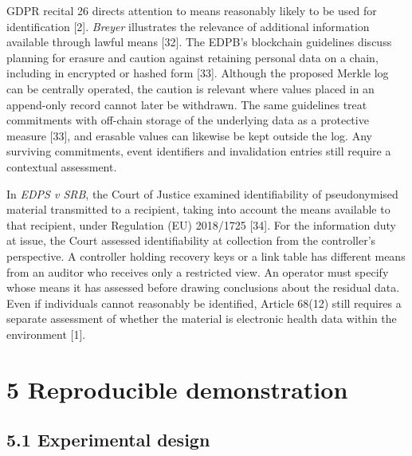 \documentclass[preprint,review,12pt]{elsarticle}
\begin{document}
GDPR recital 26 directs attention to means reasonably likely to be used
for identification {[}2{]}. \emph{Breyer} illustrates the relevance of
additional information available through lawful means {[}32{]}. The
EDPB's blockchain guidelines discuss planning for erasure and caution
against retaining personal data on a chain, including in encrypted or
hashed form {[}33{]}. Although the proposed Merkle log can be centrally
operated, the caution is relevant where values placed in an append-only
record cannot later be withdrawn. The same guidelines treat commitments
with off-chain storage of the underlying data as a protective measure
{[}33{]}, and erasable values can likewise be kept outside the log. Any
surviving commitments, event identifiers and invalidation entries still
require a contextual assessment.

In \emph{EDPS v SRB}, the Court of Justice examined identifiability of
pseudonymised material transmitted to a recipient, taking into account
the means available to that recipient, under Regulation (EU) 2018/1725
{[}34{]}. For the information duty at issue, the Court assessed
identifiability at collection from the controller's perspective. A
controller holding recovery keys or a link table has different means
from an auditor who receives only a restricted view. An operator must
specify whose means it has assessed before drawing conclusions about the
residual data. Even if individuals cannot reasonably be identified,
Article 68(12) still requires a separate assessment of whether the
material is electronic health data within the environment {[}1{]}.

\hypertarget{reproducible-demonstration}{%
\section{5 Reproducible
demonstration}\label{reproducible-demonstration}}

\hypertarget{experimental-design}{%
\subsection{5.1 Experimental design}\label{experimental-design}}
\end{document}
